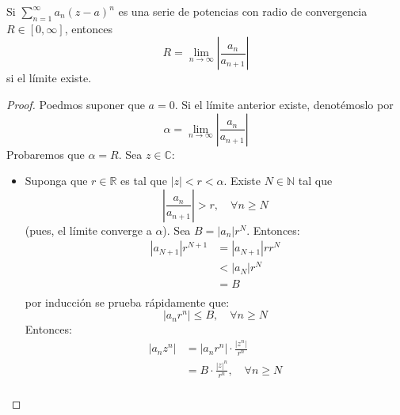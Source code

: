 \documentclass[12pt]{report}
\theoremstyle{largebreak}
\newcommand\abs[1]{\ensuremath{\left|#1\right|}}
\begin{document}
    \begin{propo}
        Si $\sum_{ n=1}^\infty a_n(z-a)^n$ es una serie de potencias con radio de convergencia $R\in[0,\infty]$, entonces
        \begin{equation*}
            R=\lim_{n\rightarrow\infty}\abs{\frac{a_n}{a_{ n+1}}}
        \end{equation*}
        si el límite existe.
    \end{propo}

    \begin{proof}
        Poedmos suponer que $a=0$. Si el límite anterior existe, denotémoslo por
        \begin{equation*}
            \alpha=\lim_{n\rightarrow\infty}\abs{\frac{a_n}{a_{ n+1}}}
        \end{equation*}
        Probaremos que $\alpha=R$. Sea $z\in\mathbb{C}$:
        \begin{itemize}
            \item Suponga que $r\in\mathbb{R}$ es tal que $\abs{z}<r<\alpha$. Existe $N\in\mathbb{N}$ tal que
            \begin{equation*}
                \abs{\frac{a_{ n}}{a_{ n+1}}}>r,\quad\forall n\geq N
            \end{equation*}
            (pues, el límite converge a $\alpha$). Sea $B=\abs{a_n}r^N$. Entonces:
            \begin{equation*}
                \begin{split}
                    \abs{a_{ N+1}}r^{N+1}&=\abs{a_{ N+1}}rr^{N}\\
                    &<\abs{a_N}r^N\\
                    &=B\\
                \end{split}
            \end{equation*}
            por inducción se prueba rápidamente que:
            \begin{equation*}
                \abs{a_nr^n}\leq B,\quad\forall n\geq N
            \end{equation*}
            Entonces:
            \begin{equation*}
                \begin{split}
                    \abs{a_nz^n}&=\abs{a_nr^n}\cdot\frac{\abs{z^n}}{r^n}\\
                    &=B\cdot\frac{\abs{z}^n}{r^n},\quad\forall n\geq N \\
                \end{split}

\end{equation*}
\end{itemize}
\end{proof}
\end{document}
